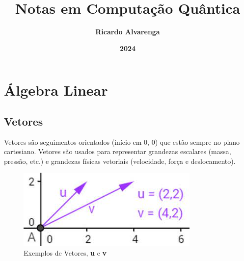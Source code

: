 \documentclass[12pt]{article}
\begin{document}
	
\title{\textbf{{\Huge Notas em Computação Quântica}}} %
\author{\textbf{{\Large Ricardo Alvarenga}}} %
\date{\textbf{{\Large 2024}}} %
\maketitle %
\thispagestyle{empty} %
\newpage

\pagestyle{fancy}
\setcounter{page}{1} %
\tableofcontents %
\newpage

\listoffigures %
\newpage


\pagestyle{fancy}
\fancyfoot[C]{\thepage} %
\newpage

\setcounter{page}{1} %
\pagestyle{fancy}
\fancyfoot[C]{\thepage}


\onehalfspacing %

\section{Álgebra Linear}

\subsection{Vetores}

Vetores são seguimentos orientados (início em 0, 0) que estão sempre no plano cartesiano. Vetores são usados para representar grandezas escalares (massa, pressão, etc.) e grandezas físicas vetoriais (velocidade, força e deslocamento).

\begin{figure}[H]
	\centering
	\includegraphics[width=.5\linewidth]{figuras/vetores_01}
	\caption[Vetores \textbf{u} e \textbf{v}]{Exemplos de Vetores, \textbf{u} e \textbf{v}}
	\label{fig:vetores01}
\end{figure}
\end{document}
